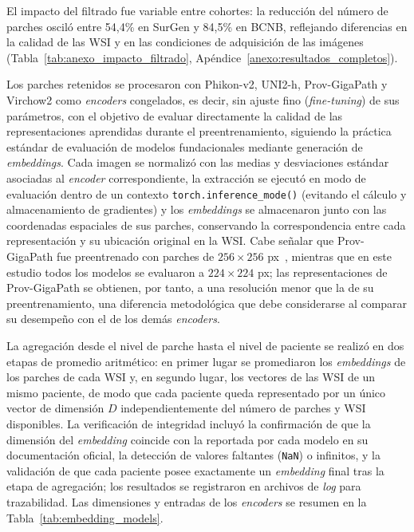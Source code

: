 El impacto del filtrado fue variable entre cohortes: la reducción del número de parches osciló entre 54,4\% en SurGen y 84,5\% en BCNB, reflejando diferencias en la calidad de las WSI y en las condiciones de adquisición de las imágenes (Tabla~\ref{tab:anexo_impacto_filtrado}, Apéndice~\ref{anexo:resultados_completos}).

Los parches retenidos se procesaron con Phikon-v2, UNI2-h, Prov-GigaPath y Virchow2 como \textit{encoders} congelados, es decir, sin ajuste fino (\textit{fine-tuning}) de sus parámetros, con el objetivo de evaluar directamente la calidad de las representaciones aprendidas durante el preentrenamiento, siguiendo la práctica estándar de evaluación de modelos fundacionales mediante generación de \textit{embeddings}. Cada imagen se normalizó con las medias y desviaciones estándar asociadas al \textit{encoder} correspondiente, la extracción se ejecutó en modo de evaluación dentro de un contexto \texttt{torch.inference\_mode()} (evitando el cálculo y almacenamiento de gradientes) y los \textit{embeddings} se almacenaron junto con las coordenadas espaciales de sus parches, conservando la correspondencia entre cada representación y su ubicación original en la WSI. Cabe señalar que Prov-GigaPath fue preentrenado con parches de $256 \times 256$ px~\parencite{xu2024provgigapath}, mientras que en este estudio todos los modelos se evaluaron a $224 \times 224$ px; las representaciones de Prov-GigaPath se obtienen, por tanto, a una resolución menor que la de su preentrenamiento, una diferencia metodológica que debe considerarse al comparar su desempeño con el de los demás \textit{encoders}.

La agregación desde el nivel de parche hasta el nivel de paciente se realizó en dos etapas de promedio aritmético: en primer lugar se promediaron los \textit{embeddings} de los parches de cada WSI y, en segundo lugar, los vectores de las WSI de un mismo paciente, de modo que cada paciente queda representado por un único vector de dimensión $D$ independientemente del número de parches y WSI disponibles. La verificación de integridad incluyó la confirmación de que la dimensión del \textit{embedding} coincide con la reportada por cada modelo en su documentación oficial, la detección de valores faltantes (\texttt{NaN}) o infinitos, y la validación de que cada paciente posee exactamente un \textit{embedding} final tras la etapa de agregación; los resultados se registraron en archivos de \textit{log} para trazabilidad. Las dimensiones y entradas de los \textit{encoders} se resumen en la Tabla~\ref{tab:embedding_models}.

